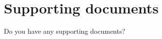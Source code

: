\chapter{Supporting documents}
\blankpage
\renewcommand{\thesection}{S.\arabic{section}}
\setcounter{section}{0}
\renewcommand{\thefigure}{\thesection.\arabic{figure}}
\setcounter{figure}{0}
\setcounter{table}{0}

Do you have any supporting documents?